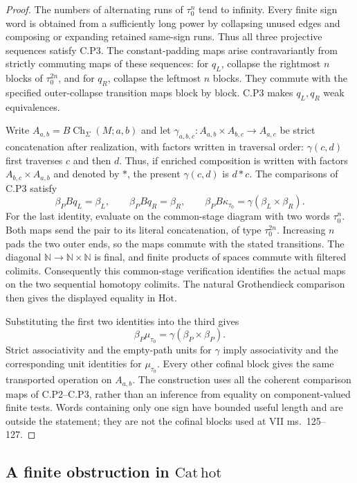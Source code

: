 \begin{proof}
The numbers of alternating runs of $\tau_0^n$ tend to infinity. Every finite sign word is obtained from a sufficiently long power by collapsing unused edges and composing or expanding retained same-sign runs. Thus all three projective sequences satisfy C.P3. The constant-padding maps arise contravariantly from strictly commuting maps of these sequences: for $q_L$, collapse the rightmost $n$ blocks of $\tau_0^{2n}$, and for $q_R$, collapse the leftmost $n$ blocks. They commute with the specified outer-collapse transition maps block by block. C.P3 makes $q_L,q_R$ weak equivalences.

Write $A_{a,b}=B\operatorname{Ch}_\Sigma(M;a,b)$ and let $\gamma_{a,b,c}:A_{a,b}\times A_{b,c}\to A_{a,c}$ be strict concatenation after realization, with factors written in traversal order: $\gamma(c,d)$ first traverses $c$ and then $d$. Thus, if enriched composition is written with factors $A_{b,c}\times A_{a,b}$ and denoted by $*$, the present $\gamma(c,d)$ is $d*c$. The comparisons of C.P3 satisfy
\[
 \beta_P Bq_L=\beta_L,\qquad
 \beta_P Bq_R=\beta_R,
 \qquad
 \beta_P B\kappa_{\tau_0}
       =\gamma(\beta_L\times\beta_R).
\]
For the last identity, evaluate on the common-stage diagram with two words $\tau_0^n$. Both maps send the pair to its literal concatenation, of type $\tau_0^{2n}$. Increasing $n$ pads the two outer ends, so the maps commute with the stated transitions. The diagonal $\mathbb N\to\mathbb N\times\mathbb N$ is final, and finite products of spaces commute with filtered colimits. Consequently this common-stage verification identifies the actual maps on the two sequential homotopy colimits. The natural Grothendieck comparison then gives the displayed equality in $\mathrm{Hot}$.

Substituting the first two identities into the third gives
\[
 \beta_P\mu_{\tau_0}
   =\gamma(\beta_P\times\beta_P).
\]
Strict associativity and the empty-path units for $\gamma$ imply associativity and the corresponding unit identities for $\mu_{\tau_0}$. Every other cofinal block gives the same transported operation on $A_{a,b}$. The construction uses all the coherent comparison maps of C.P2--C.P3, rather than an inference from equality on component-valued finite tests. Words containing only one sign have bounded useful length and are outside the statement; they are not the cofinal blocks used at VII ms.~125--127.
\end{proof}

\subsection{A finite obstruction in \texorpdfstring{$\mathrm{Cat}\,\mathrm{hot}$}{Cat hot}}

